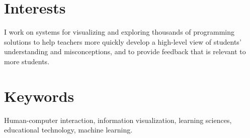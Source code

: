 \documentclass[margin]{res}
\begin{document}
 

 
\address{32 Vassar Street, Rm 32-G715\\Cambridge, MA 02139}
\address{ELG@MIT.edu\\
(215) 694-9631} 

 
\begin{resume} 
 
\section{Interests} 
I work on systems for visualizing and exploring thousands of programming solutions to help teachers more quickly develop a high-level view of students' understanding and misconceptions, and to provide feedback that is relevant to more students. 

\section{Keywords} 
Human-computer interaction, information visualization, learning sciences, educational technology, machine learning.


\end{resume}
\end{document}
